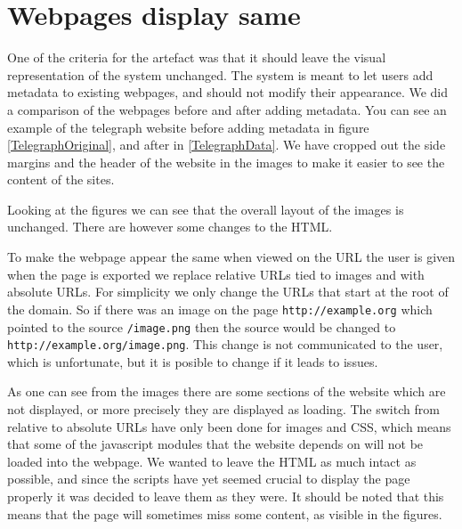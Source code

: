 
\section{Webpages display same}
\label{Rendering}
One of the criteria for the artefact was that it should leave the visual representation of the system unchanged.
The system is meant to let users add metadata to existing webpages, and should not modify their appearance.
We did a comparison of the webpages before and after adding metadata.
You can see an example of the telegraph website before adding metadata in figure \ref{TelegraphOriginal},
and after in \ref{TelegraphData}.
We have cropped out the side margins and the header of the website in the images to make it easier to see the content of the sites.


Looking at the figures we can see that the overall layout of the images is unchanged.
There are however some changes to the HTML.

To make the webpage appear the same when viewed on the URL the user is given when the page is exported
we replace relative URLs tied to images and  with absolute URLs.
For simplicity we only change the URLs that start at the root of the domain.
So if there was an image on the page \texttt{http://example.org} which pointed to the source \texttt{/image.png}
then the source would be changed to \texttt{http://example.org/image.png}.
This change is not communicated to the user, which is unfortunate,
but it is posible to change if it leads to issues.

As one can see from the images there are some sections of the website which are not displayed, or more precisely they
are displayed as loading.
The switch from relative to absolute URLs have only been done for images and CSS,
which means that some of the javascript modules that the website depends on will not be loaded into the webpage.
We wanted to leave the HTML as much intact as possible,
and since the scripts have yet seemed crucial to display the page properly it was decided to leave them as they were.
It should be noted that this means that the page will sometimes miss some content, as visible in the figures.

